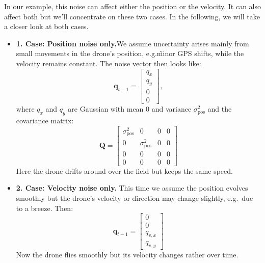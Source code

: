 \begin{example}
In our example, this noise can affect either the position or the velocity. It can also affect both but we'll concentrate on these two cases. In the following, we will take a closer look at both cases. 

\begin{itemize}
    \item{\textbf{1. Case: Position noise only.}}We assume uncertainty arises mainly from small movements in the drone's position, e.g.\~ minor GPS shifts, while the velocity remains constant. The noise vector then looks like:
    \[\mathbf{q}_{t-1} = \begin{bmatrix}
        q_x \\
        q_y \\
        0 \\
        0
    \end{bmatrix},\]
    where $q_x$ and $q_y$ are Gaussian with mean $0$ and variance $\sigma_\text{pos}^2$ and the covariance matrix: 
    \[\mathbf{Q}=\begin{bmatrix}
        \sigma_\text{pos}^2 & 0 & 0 & 0 \\
        0 & \sigma_\text{pos}^2 & 0 & 0 \\
        0 & 0 & 0 & 0 \\
        0 & 0 & 0 & 0 
    \end{bmatrix}\]
    Here the drone drifts around over the field but keeps the same speed. 
    
    \item{\textbf{2. Case: Velocity noise only.}} This time we assume the position evolves smoothly but the drone's velocity or direction may change slightly, e.g.~due to a breeze. Then:
    \[\mathbf{q}_{t-1}= \begin{bmatrix}
        0 \\
        0 \\
        q_{v,x} \\
        q_{v,y}
    \end{bmatrix}\]
    Now the drone flies smoothly but its velocity changes rather over time. 
\end{itemize}
\end{example}





